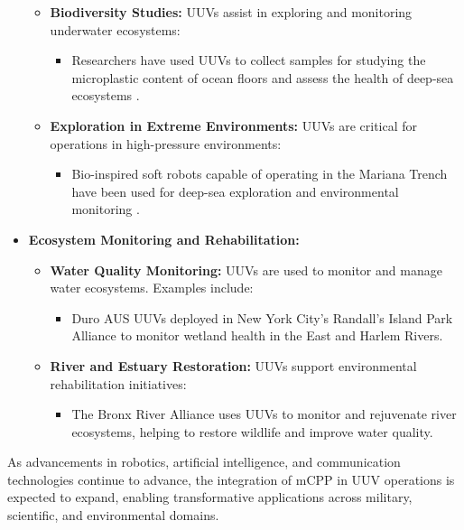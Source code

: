 \begin{itemize}
\begin{itemize}
		\item \textbf{Biodiversity Studies:}  
		UUVs assist in exploring and monitoring underwater ecosystems:
		\begin{itemize}
			\item Researchers have used UUVs to collect samples for studying the microplastic content of ocean floors and assess the health of deep-sea ecosystems \cite{DeepSea2021}.
		\end{itemize}
		
		\item \textbf{Exploration in Extreme Environments:}  
		UUVs are critical for operations in high-pressure environments:
		\begin{itemize}
			\item Bio-inspired soft robots capable of operating in the Mariana Trench have been used for deep-sea exploration and environmental monitoring \cite{Mariana2021}.
		\end{itemize}
	\end{itemize}
	
	\item \textbf{Ecosystem Monitoring and Rehabilitation:}
	\begin{itemize}
		\item \textbf{Water Quality Monitoring:}  
		UUVs are used to monitor and manage water ecosystems. Examples include:
		\begin{itemize}
			\item Duro AUS UUVs deployed in New York City's Randall's Island Park Alliance to monitor wetland health in the East and Harlem Rivers.
		\end{itemize}
		
		\item \textbf{River and Estuary Restoration:}  
		UUVs support environmental rehabilitation initiatives:
		\begin{itemize}
			\item The Bronx River Alliance uses UUVs to monitor and rejuvenate river ecosystems, helping to restore wildlife and improve water quality.
		\end{itemize}
	\end{itemize}
\end{itemize}

\noindent As advancements in robotics, artificial intelligence, and communication technologies continue to advance, the integration of mCPP in UUV operations is expected to expand, enabling transformative applications across military, scientific, and environmental domains.

